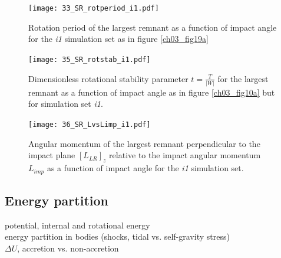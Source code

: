 {\begin{landscape}
\begin{figure}
\begin{center}
\texttt{[image: 33\_SR\_rotperiod\_i1.pdf]}
\caption{Rotation period of the largest remnant as a function of impact angle for the \emph{i1} simulation set as in figure \ref{ch03_fig19a} }
\label{ch03_fig33c}
\end{center}
\end{figure}

\begin{figure}
\begin{center}
\texttt{[image: 35\_SR\_rotstab\_i1.pdf]}
\caption{Dimensionless rotational stability parameter $t = \frac{T}{|W|}$ for the largest remnant as a function of impact angle as in figure \ref{ch03_fig10a} but for simulation set \emph{i1}.}
\label{ch03_fig35c}
\end{center}
\end{figure}

\begin{figure}
\begin{center}
\texttt{[image: 36\_SR\_LvsLimp\_i1.pdf]}
\caption{Angular momentum of the largest remnant perpendicular to the impact plane $[L_{LR}]_z$ relative to the impact angular momentum $L_{imp}$ as a function of impact angle for the \emph{i1} simulation set.}
\label{ch03_fig36c}
\end{center}
\end{figure}

\end{landscape}
}


\subsection{Energy partition}
potential, internal and rotational energy\\
energy partition in bodies (shocks, tidal vs. self-gravity stress) \\
$\Delta U$, accretion vs. non-accretion \\

